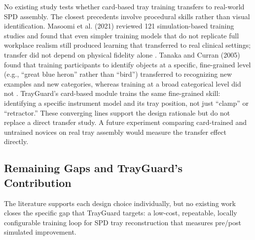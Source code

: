 \documentclass[10pt,a4paper]{article}
\begin{document}
No existing study tests whether card-based tray training transfers to real-world SPD assembly. The closest precedents involve procedural skills rather than visual identification. Masoomi et al. (2021) reviewed 121 simulation-based training studies and found that even simpler training models that do not replicate full workplace realism still produced learning that transferred to real clinical settings; transfer did not depend on physical fidelity alone \cite{masoomi-et-al-2021}. Tanaka and Curran (2005) found that training participants to identify objects at a specific, fine-grained level (e.g., ``great blue heron'' rather than ``bird'') transferred to recognizing new examples and new categories, whereas training at a broad categorical level did not \cite{tanaka-and-curran-2005}. TrayGuard's card-based module trains the same fine-grained skill: identifying a specific instrument model and its tray position, not just ``clamp'' or ``retractor.'' These converging lines support the design rationale but do not replace a direct transfer study. A future experiment comparing card-trained and untrained novices on real tray assembly would measure the transfer effect directly.

\subsection{Remaining Gaps and TrayGuard's Contribution}


The literature supports each design choice individually, but no existing work closes the specific gap that TrayGuard targets: a low-cost, repeatable, locally configurable training loop for SPD tray reconstruction that measures pre/post simulated improvement.
\end{document}
